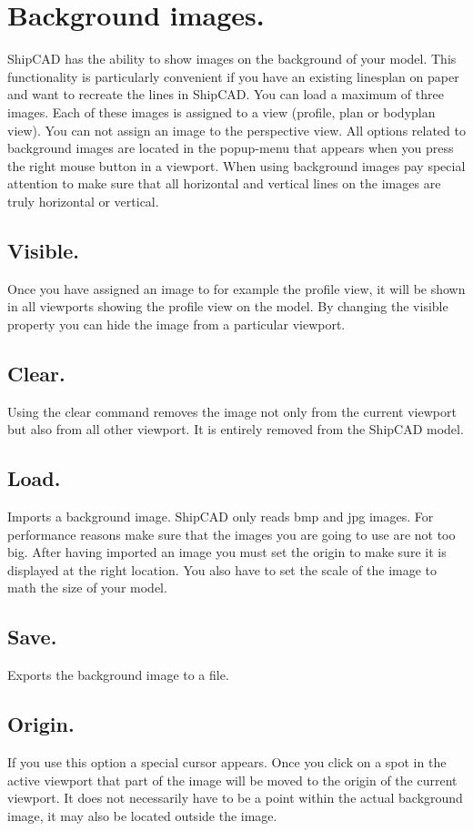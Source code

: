 \documentclass[12pt]{article}
\begin{document}
\section{Background images.}
ShipCAD has the ability to show images on the background of your model. This functionality is
particularly convenient if you have an existing linesplan on paper and want to recreate the lines in
ShipCAD. You can load a maximum of three images. Each of these images is assigned to a view
(profile, plan or bodyplan view). You can not
assign an image to the perspective view. All
options related to background images are located
in the popup-menu that appears when you press
the right mouse button in a viewport. When using
background images pay special attention to make
sure that all horizontal and vertical lines on the
images are truly horizontal or vertical.

\subsection{Visible.}
Once you have assigned an image to for example the profile view, it will be shown in all viewports
showing the profile view on the model. By changing the visible property you can hide the image
from a particular viewport.

\subsection{Clear.}
Using the clear command removes the image not only from the current viewport but also from all
other viewport. It is entirely removed from the ShipCAD model.

\subsection{Load.}
Imports a background image. ShipCAD only reads bmp and jpg images. For performance reasons
make sure that the images you are going to use are not too big. After having imported an image you
must set the origin to make sure it is displayed at the right location. You also have to set the scale
of the image to math the size of your model.

\subsection{Save.}
Exports the background image to a file.

\subsection{Origin.}
If you use this option a special cursor appears. Once you click on a spot in the active viewport that
part of the image will be moved to the origin of the current viewport. It does not necessarily have to
be a point within the actual background image, it may also be located outside the image.
\end{document}
